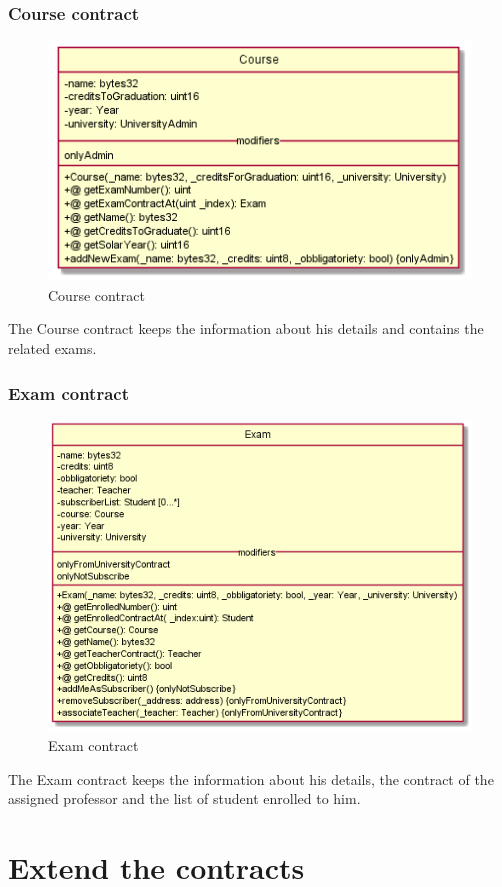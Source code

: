 \documentclass[ManualeSviluppatore]{subfiles}
\begin{document}
\subsubsection{Course contract}
\begin{figure}[H]
\centering
\includegraphics[width=0.7\linewidth]{"diagrammi/solidity/course"}
\caption{Course contract}
\label{fig:Course contract}
\end{figure}
The Course contract keeps the information about his details and contains the related exams. \\

\subsubsection{Exam contract}
\begin{figure}[H]
\centering
\includegraphics[width=0.7\linewidth]{"diagrammi/solidity/exam"}
\caption{Exam contract}
\label{fig:Exam contract}
\end{figure}
The Exam contract keeps the information about his details, the contract of the assigned professor and the list of student enrolled to him. \\

\newpage
\section{Extend the contracts}
\end{document}
